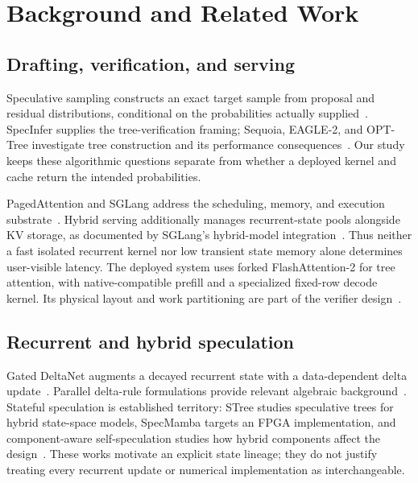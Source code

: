 \documentclass[conference]{IEEEtran}
\begin{document}
\section{Background and Related Work}
\label{sec:related}
\subsection{Drafting, verification, and serving}
Speculative sampling constructs an exact target sample from proposal and residual distributions, conditional on the probabilities actually supplied~\cite{leviathan2023fast,chen2023sampling}. SpecInfer supplies the tree-verification framing; Sequoia, EAGLE-2, and OPT-Tree investigate tree construction and its performance consequences~\cite{miao2023specinfer,chen2024sequoia,li2024eagle,wang2024opt}. Our study keeps these algorithmic questions separate from whether a deployed kernel and cache return the intended probabilities.

PagedAttention and SGLang address the scheduling, memory, and execution substrate~\cite{kwon2023efficient,zheng2024sglang}. Hybrid serving additionally manages recurrent-state pools alongside KV storage, as documented by SGLang's hybrid-model integration~\cite{pytorch2025sglang,sglang2026qwen}. Thus neither a fast isolated recurrent kernel nor low transient state memory alone determines user-visible latency. The deployed system uses forked FlashAttention-2 for tree attention, with native-compatible prefill and a specialized fixed-row decode kernel. Its physical layout and work partitioning are part of the verifier design~\cite{dao2023flashattention,lumo2026archive}.

\subsection{Recurrent and hybrid speculation}
Gated DeltaNet augments a decayed recurrent state with a data-dependent delta update~\cite{yang2024gated}. Parallel delta-rule formulations provide relevant algebraic background~\cite{yang2024delta}. Stateful speculation is established territory: STree studies speculative trees for hybrid state-space models, SpecMamba targets an FPGA implementation, and component-aware self-speculation studies how hybrid components affect the design~\cite{wu2025stree,zhong2025specmamba,borobia2026component}. These works motivate an explicit state lineage; they do not justify treating every recurrent update or numerical implementation as interchangeable.
\end{document}
